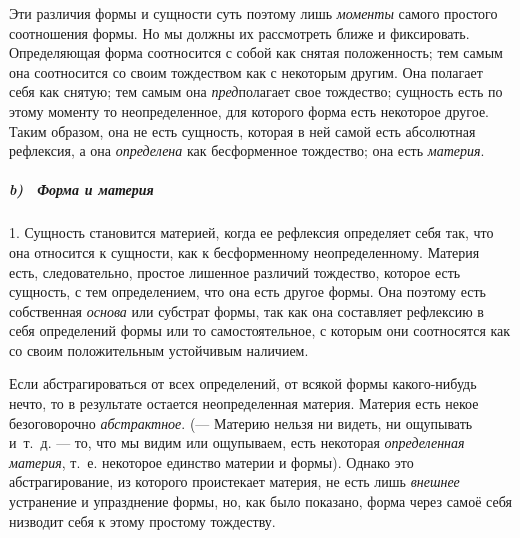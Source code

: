 Эти различия формы и сущности суть поэтому лишь
{\em моменты} самого простого соотношения формы. Но мы
должны их рассмотреть ближе и фиксировать. Определяющая форма соотносится с
собой как снятая положенность; тем самым она соотносится со своим
тождеством как с некоторым другим. Она полагает себя как снятую; тем самым
она {\em пред}полагает свое тождество; сущность есть по
этому моменту то неопределенное, для которого форма есть некоторое другое.
Таким образом, она не есть сущность, которая в ней самой есть абсолютная
рефлексия, а она {\em определена} как бесформенное
тождество; она есть {\em материя}.

\subparagraph[b) \ Форма и материя]{b) \ Форма и материя}
\hypertarget{Toc478978723}{}1. Сущность становится материей, когда ее
рефлексия определяет себя так, что она относится к сущности, как к
бесформенному неопределенному. Материя есть, следовательно, простое
лишенное различий тождество, которое есть сущность, с тем определением, что
она есть другое формы. Она поэтому есть собственная
{\em основа} или субстрат формы, так как она составляет
рефлексию в себя определений формы или то самостоятельное, с которым они
соотносятся как со своим положительным устойчивым наличием.

Если абстрагироваться от всех определений, от всякой формы какого-нибудь
нечто, то в результате остается неопределенная материя. Материя есть некое
безоговорочно {\em абстрактное}. (— Материю нельзя ни
видеть, ни ощупывать и~т.~д. — то, что мы видим или ощупываем, есть
некоторая {\em определенная материя}, т.~е. некоторое
единство материи и формы). Однако это абстрагирование, из которого
проистекает материя, не есть лишь {\em внешнее}
устранение и упразднение формы, но, как было показано, форма через самоё
себя низводит себя к этому простому тождеству.


